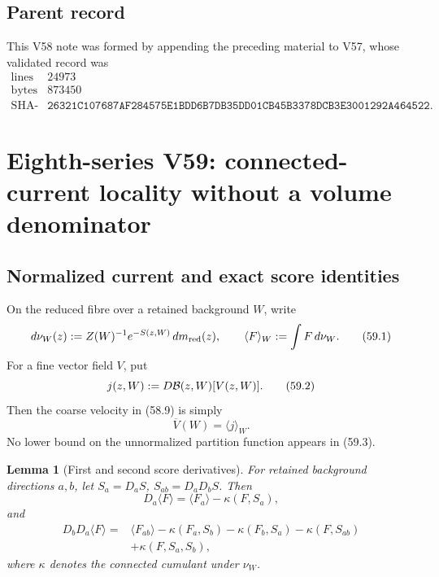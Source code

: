 \documentclass[11pt,oneside]{book}
\newtheorem{lemma}[theorem]{Lemma}
\theoremstyle{definition}
\theoremstyle{remark}
\begin{document}
\subsection{Parent record}

This V58 note was formed by appending the preceding material to V57,
whose validated record was
\[
\begin{array}{c|c}
\text{lines}&24973\\
\text{bytes}&873450\\
\text{SHA-256}&
\texttt{26321C107687AF284575E1BDD6B7DB35DD01CB45B3378DCB3E3001292A464522}.
\end{array}
\]



\section{Eighth-series V59: connected-current locality without a
volume denominator}
\label{sec:e8v59}

\subsection{Normalized current and exact score identities}

On the reduced fibre over a retained background \(W\), write
\[
 d\nu_W(z):=Z(W)^{-1}e^{-S(z,W)}\,dm_{\rm red}(z),\qquad
 \langle F\rangle_W:=\int F\,d\nu_W.                         \tag{59.1}
\]
For a fine vector field \(V\), put
\[
 j(z,W):=D{\cal B}(z,W)[V(z,W)].                              \tag{59.2}
\]
Then the coarse velocity in (58.9) is simply
\[
 \overline V(W)=\langle j\rangle_W.                          \tag{59.3}
\]
No lower bound on the unnormalized partition function appears in
(59.3).

\begin{lemma}[First and second score derivatives]
\label{lem:e8v59-score-derivatives}
For retained background directions \(a,b\), let
\(S_a=D_aS\), \(S_{ab}=D_aD_bS\).  Then
\[
 D_a\langle F\rangle
 =\langle F_a\rangle-\kappa(F,S_a),                           \tag{59.4}
\]
and
\[
\boxed{\begin{split}
 D_bD_a\langle F\rangle
 ={}&\langle F_{ab}\rangle
 -\kappa(F_a,S_b)-\kappa(F_b,S_a)-\kappa(F,S_{ab})\\
 &+\kappa(F,S_a,S_b),
\end{split}}                                                  \tag{59.5}
\]
where \(\kappa\) denotes the connected cumulant under \(\nu_W\).
\end{lemma}
\end{document}
